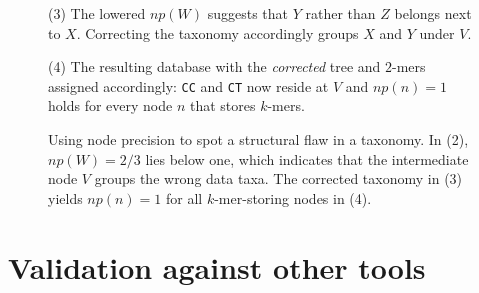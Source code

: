 \documentclass[pdflatex,sn-vancouver-num]{sn-jnl}
\begin{document}
\begin{figure}[h]
        \begin{minipage}[c]{0.25\textwidth}
            \begin{flushleft}(3) The lowered $np(W)$ suggests that $Y$ rather than $Z$ belongs next to $X$. Correcting the taxonomy accordingly groups $X$ and $Y$ under $V$.
            \end{flushleft}
        \end{minipage}
        \begin{minipage}[c]{0.2\textwidth}
        \end{minipage}
        \begin{minipage}[c]{0.25\textwidth}
            \begin{flushleft}(4) The resulting database with the \emph{corrected} tree and $2$-mers assigned accordingly: \texttt{CC} and \texttt{CT} now reside at $V$ and $np(n) = 1$ holds for every node $n$ that stores $k$-mers.\end{flushleft}
        \end{minipage}
        \begin{minipage}[c]{0.2\textwidth}
        \end{minipage}

        \vspace{0.2cm}

        \caption{Using node precision to spot a structural flaw in a taxonomy. In (2), $np(W) = 2/3$ lies below one, which indicates that the intermediate node $V$ groups the wrong data taxa. The corrected taxonomy in (3) yields $np(n) = 1$ for all $k$-mer-storing nodes in (4).}\label{npflaw}
    \end{figure}

  \section{Validation against other tools}\label{validation}
    
\end{document}
